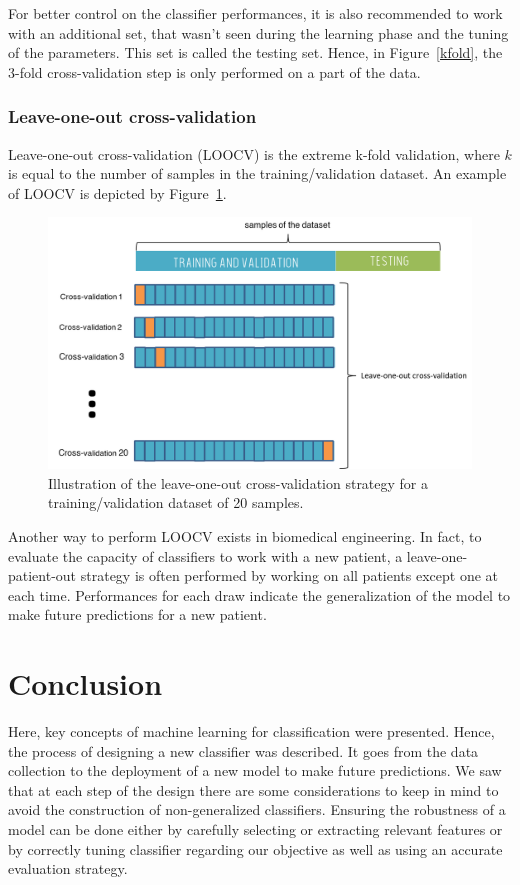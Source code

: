 \documentclass[a4paper,10pt]{article}
\begin{document}
For better control on the classifier performances, it is also recommended to work with an additional set, that wasn't seen during the learning phase and the tuning of the parameters. This set is called the testing set. Hence, in Figure~\ref{kfold}, the 3-fold cross-validation step is only performed on a part of the data.

\subsubsection{Leave-one-out cross-validation}

Leave-one-out cross-validation (LOOCV) is the extreme k-fold validation, where $k$ is equal to the number of samples in the training/validation dataset. An example of LOOCV is depicted by Figure~\ref{LOOCV}.

\begin{figure}[htbp]
\centerline{\includegraphics[width=0.8\linewidth]{./figures/loocv.png}}
\caption{Illustration of the leave-one-out cross-validation strategy for a training/validation dataset of 20 samples.}
\label{LOOCV}
\end{figure}

Another way to perform LOOCV exists in biomedical engineering. In fact, to 
evaluate the capacity of classifiers to work with a new patient, a leave-one-patient-out strategy is often performed by working on all patients except one at each time. Performances for each draw indicate the generalization of the model to make future predictions for a new patient.

\section{Conclusion}
Here, key concepts of machine learning for classification were presented. Hence, the process of designing a new classifier was described. It goes from the data collection to the deployment of a new model to make future predictions. We saw that at each step of the design there are some considerations to keep in mind to avoid the construction of non-generalized classifiers. Ensuring the robustness of a model can be done either by carefully selecting or extracting relevant features or by correctly tuning classifier regarding our objective as well as using an accurate evaluation strategy. 
\end{document}
